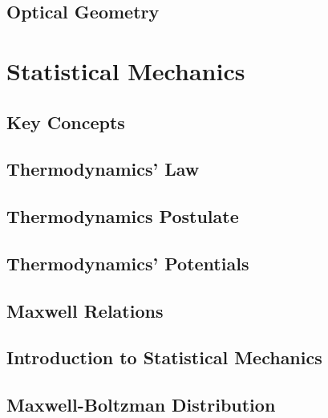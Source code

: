 \documentclass[10pt]{report}
\begin{document}
\section{Optical Geometry}
\clearpage


\chapter{Statistical Mechanics}\clearpage
\section{Key Concepts}
\clearpage

\section{Thermodynamics' Law}
\clearpage

\section{Thermodynamics Postulate}
\clearpage

\section{Thermodynamics' Potentials}
\clearpage

\section{Maxwell Relations}
\clearpage

\section{Introduction to Statistical Mechanics}
\clearpage

\section{Maxwell-Boltzman Distribution}
\clearpage
\clearpage
\end{document}
